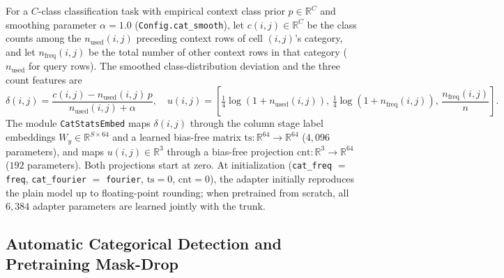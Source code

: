 \documentclass[11pt]{article}
\newcommand{\R}{\mathbb{R}}
\begin{document}
\begin{enumerate}
For a $C$-class classification task with empirical context class prior $p \in \R^C$ and smoothing parameter $\alpha = 1.0$ (\texttt{Config.cat\_smooth}), let $c(i,j) \in \R^C$ be the class counts among the $n_{\text{used}}(i,j)$ preceding context rows of cell $(i,j)$'s category, and let $n_{\text{freq}}(i,j)$ be the total number of other context rows in that category ($n_{\text{used}}$ for query rows).
The smoothed class-distribution deviation and the three count features are
\begin{equation}
\delta(i,j) = \frac{c(i,j) - n_{\text{used}}(i,j)\, p}{n_{\text{used}}(i,j) + \alpha}, \quad
u(i,j) = \left[ \tfrac{1}{4}\log(1 + n_{\text{used}}(i,j)),\, \tfrac{1}{4}\log(1 + n_{\text{freq}}(i,j)),\, \frac{n_{\text{freq}}(i,j)}{n} \right].
\label{eq:cat-stats}
\end{equation}
The module \texttt{CatStatsEmbed} maps $\delta(i,j)$ through the column stage label embeddings $W_y\in\R^{S\times64}$ and a learned bias-free matrix $\mathrm{ts}:\R^{64}\to\R^{64}$ ($4{,}096$ parameters), and maps $u(i,j)\in\R^3$ through a bias-free projection $\mathrm{cnt}:\R^3\to\R^{64}$ ($192$ parameters). Both projections start at zero. %
At initialization (\texttt{cat\_freq} $=$ \texttt{freq}, \texttt{cat\_fourier} $=$ \texttt{fourier}, $\mathrm{ts}=0$, $\mathrm{cnt}=0$), the adapter initially reproduces the plain model up to floating-point rounding; when pretrained from scratch, all $6{,}384$ adapter parameters are learned jointly with the trunk.
\end{enumerate}

\subsection{Automatic Categorical Detection and Pretraining Mask-Drop}
\label{sec:cat-auto}
\end{document}
